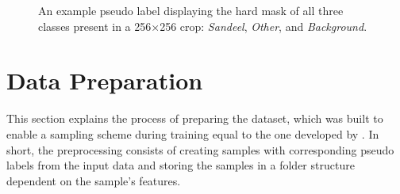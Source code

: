 
        \begin{figure}[H]
        \centering
        	\label{subfig:correct}
        	
        
        
        
        \caption[Pseudo label]{An example pseudo label displaying the hard mask of all three classes present in a 256×256 crop: \textit{Sandeel}, \textit{Other}, and \textit{Background}.} %
        \label{data sample fig}
        
        \end{figure}


        
    \section{Data Preparation}
        This section explains the process of preparing the dataset, which was built to enable a sampling scheme during training equal to the one developed by \citeauthor{brautaset2020acoustic}\cite{brautaset2020acoustic}. In short, the preprocessing consists of creating samples with corresponding pseudo labels from the input data and storing the samples in a folder structure dependent on the sample's features.
        
       

